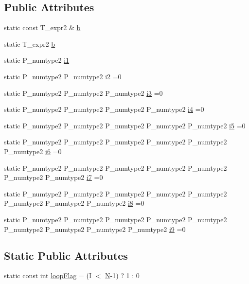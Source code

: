 \subsection*{Public Attributes}
\begin{DoxyCompactItemize}
\item 
static const T\+\_\+expr2 \& \hyperlink{class__bz__meta__vectorDot_ad7f93a12572bd4ece39058b28b9fb05e}{b}
\item 
static T\+\_\+expr2 \hyperlink{class__bz__meta__vectorDot_ad1903677045a497386f8ca43d2e34566}{b}
\item 
static P\+\_\+numtype2 \hyperlink{class__bz__meta__vectorDot_ae5402e68a79a4888a534da85279c0fd1}{i1}
\item 
static P\+\_\+numtype2 P\+\_\+numtype2 \hyperlink{class__bz__meta__vectorDot_a8a94d994b688356ea47b02fb4ab902de}{i2} =0
\item 
static P\+\_\+numtype2 P\+\_\+numtype2 P\+\_\+numtype2 \hyperlink{class__bz__meta__vectorDot_a9a543b54777d6bd1dfb5234e7a257349}{i3} =0
\item 
static P\+\_\+numtype2 P\+\_\+numtype2 P\+\_\+numtype2 P\+\_\+numtype2 \hyperlink{class__bz__meta__vectorDot_a0640208203def938760605ff450daab7}{i4} =0
\item 
static P\+\_\+numtype2 P\+\_\+numtype2 P\+\_\+numtype2 P\+\_\+numtype2 P\+\_\+numtype2 \hyperlink{class__bz__meta__vectorDot_aea440a95407cd653fbaed1765a4dcd2f}{i5} =0
\item 
static P\+\_\+numtype2 P\+\_\+numtype2 P\+\_\+numtype2 P\+\_\+numtype2 P\+\_\+numtype2 P\+\_\+numtype2 \hyperlink{class__bz__meta__vectorDot_a11e7bc093533e67c133b2d60e749d2a0}{i6} =0
\item 
static P\+\_\+numtype2 P\+\_\+numtype2 P\+\_\+numtype2 P\+\_\+numtype2 P\+\_\+numtype2 P\+\_\+numtype2 P\+\_\+numtype2 \hyperlink{class__bz__meta__vectorDot_a30efdfcb5e446025d7ac16cd30c801d6}{i7} =0
\item 
static P\+\_\+numtype2 P\+\_\+numtype2 P\+\_\+numtype2 P\+\_\+numtype2 P\+\_\+numtype2 P\+\_\+numtype2 P\+\_\+numtype2 P\+\_\+numtype2 \hyperlink{class__bz__meta__vectorDot_a55f15e8fefa216f49bd5119b0af133ed}{i8} =0
\item 
static P\+\_\+numtype2 P\+\_\+numtype2 P\+\_\+numtype2 P\+\_\+numtype2 P\+\_\+numtype2 P\+\_\+numtype2 P\+\_\+numtype2 P\+\_\+numtype2 P\+\_\+numtype2 \hyperlink{class__bz__meta__vectorDot_ad59d3e16ee2ccccc95109dd7371931ef}{i9} =0
\end{DoxyCompactItemize}
\subsection*{Static Public Attributes}
\begin{DoxyCompactItemize}
\item 
static const int \hyperlink{class__bz__meta__vectorDot_a34c2503a3f004cdf6c10fe12b9a2e74c}{loop\+Flag} = (I $<$ \hyperlink{polmisc_8c_a0240ac851181b84ac374872dc5434ee4}{N}-\/1) ? 1 \+: 0
\end{DoxyCompactItemize}


